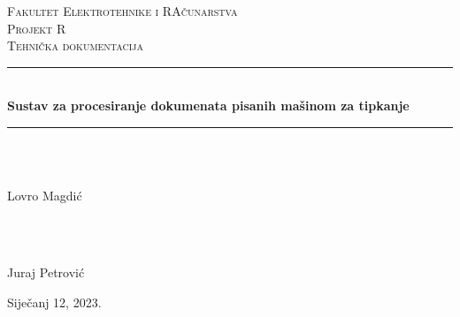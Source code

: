 \documentclass{article}
\begin{document}
\begin{titlepage}
	\newcommand{\HRule}{\rule{\linewidth}{0.5mm}} %
	
	\center %
	
	
	\textsc{\LARGE Fakultet Elektrotehnike i RAčunarstva}\\[1.5cm] %
	\vfill
	\textsc{\Large Projekt R}\\[0.5cm]
	\textsc{\large Tehnička dokumentacija}\\[0.5cm] %
	\HRule\\[0.4cm]
	{\huge\bfseries Sustav za procesiranje dokumenata pisanih mašinom za tipkanje}\\[0.4cm] %
	
	\HRule\\[1.5cm]
	
	
	\begin{minipage}{0.4\textwidth}
		\begin{flushleft}
			\large
			\\
			Lovro Magdić
		\end{flushleft}
	\end{minipage}
	~
	\begin{minipage}{0.4\textwidth}
		\begin{flushright}
			\large
			\\
			Juraj Petrović
		\end{flushright}
	\end{minipage}
        \vfill\vfill
	{\large Siječanj 12, 2023.} %
	\vfill %
\end{titlepage}
\end{document}
